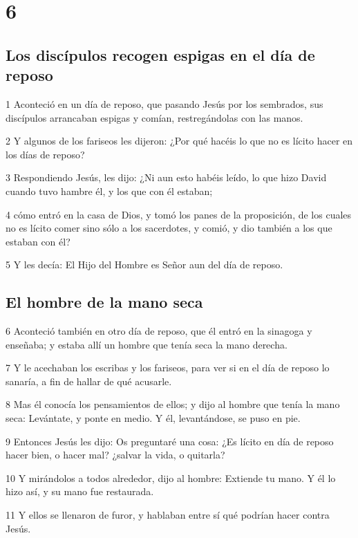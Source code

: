 \chapter{6}

\section*{Los discípulos recogen espigas en el día de reposo}

\par 1 Aconteció en un día de reposo, que pasando Jesús por los sembrados, sus discípulos arrancaban espigas y comían, restregándolas con las manos.
\par 2 Y algunos de los fariseos les dijeron: ¿Por qué hacéis lo que no es lícito hacer en los días de reposo?
\par 3 Respondiendo Jesús, les dijo: ¿Ni aun esto habéis leído, lo que hizo David cuando tuvo hambre él, y los que con él estaban;
\par 4 cómo entró en la casa de Dios, y tomó los panes de la proposición, de los cuales no es lícito comer sino sólo a los sacerdotes, y comió, y dio también a los que estaban con él?
\par 5 Y les decía: El Hijo del Hombre es Señor aun del día de reposo.

\section*{El hombre de la mano seca}

\par 6 Aconteció también en otro día de reposo, que él entró en la sinagoga y enseñaba; y estaba allí un hombre que tenía seca la mano derecha.
\par 7 Y le acechaban los escribas y los fariseos, para ver si en el día de reposo lo sanaría, a fin de hallar de qué acusarle.
\par 8 Mas él conocía los pensamientos de ellos; y dijo al hombre que tenía la mano seca: Levántate, y ponte en medio. Y él, levantándose, se puso en pie.
\par 9 Entonces Jesús les dijo: Os preguntaré una cosa: ¿Es lícito en día de reposo hacer bien, o hacer mal? ¿salvar la vida, o quitarla?
\par 10 Y mirándolos a todos alrededor, dijo al hombre: Extiende tu mano. Y él lo hizo así, y su mano fue restaurada.
\par 11 Y ellos se llenaron de furor, y hablaban entre sí qué podrían hacer contra Jesús.

